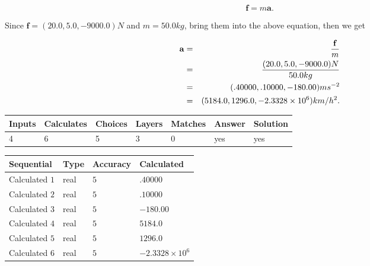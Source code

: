\documentclass[12pt]{article}
\begin{document}
\[
\mathbf{f}=m\mathbf{a}.
\]
 
Since $\mathbf{f}=( %
20.0,  %
5.0,  %
-9000.0 )N$
and $m= %
50.0kg$, bring them into the above equation, then we get
 
\begin{eqnarray*}
\mathbf{a}&=&\frac{\mathbf{f}}m  \\
&=&\frac{(
20.0 ,
5.0 ,
-9000.0 )N
}{ %
50.0 kg}  \\
&=&(
.40000 ,
.10000,
-180.00
)ms^{-2} \\
&=&(
5184.0 ,
1296.0 ,
-2.3328 \times 10^{6}
)km/h^2.
\end{eqnarray*}
 
 
 
\noindent{}
 
 

 
\vspace{0.3in}
   
   
   
   
\noindent\begin{tabular}{|l|l|l|l|l|l|l|}
 \hline
Inputs & Calculates & Choices & Layers & Matches & Answer & Solution \\ \hline
           4 & 
           6 & 
           5
  & 
           3 & 
           0 & 
  yes & 
  yes 
  \\ \hline
 \end{tabular}
   
   
   
   
\noindent{}
   
   
  
  
\noindent\begin{tabular}{|l|l|l|l|}
\hline
 Sequential & Type & Accuracy & Calculated \\ 
\hline
 
 
  Calculated $           1$ & real & $           5 $ & 
 $ .40000 $ 
 \\  \hline  
 
 
  Calculated $           2$ & real & $           5 $ & 
 $ .10000 $ 
 \\  \hline  
 
 
  Calculated $           3$ & real & $           5 $ & 
 $ -180.00 $ 
 \\  \hline  
 
 
  Calculated $           4$ & real & $           5 $ & 
 $ 5184.0 $ 
 \\  \hline  
 
 
  Calculated $           5$ & real & $           5 $ & 
 $ 1296.0 $ 
 \\  \hline  
 
 
  Calculated $           6$ & real & $           5 $ & 
 $ -2.3328 \times 10^{6} $ 
 \\  \hline  
 \end{tabular}
   
\end{document}

